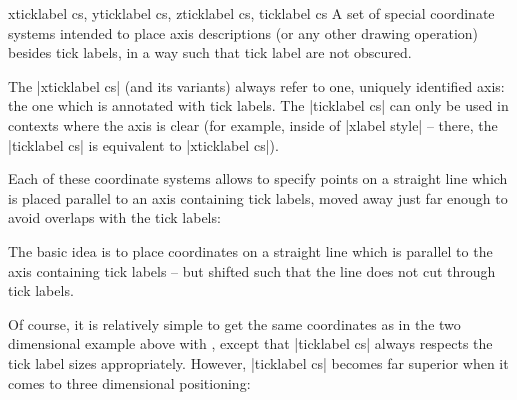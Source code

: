 \begin{coordinatesystemlist}{%
	xticklabel cs,%
	yticklabel cs,%
	zticklabel cs,
	ticklabel cs}
	A set of special coordinate systems intended to place axis descriptions (or any other drawing operation) besides tick labels, in a way such that tick label are not obscured.

	The |xticklabel cs| (and its variants) always refer to one, uniquely identified axis: the one which is annotated with tick labels. The |ticklabel cs| can only be used in contexts where the axis is clear (for example, inside of |xlabel style| -- there, the |ticklabel cs| is equivalent to |xticklabel cs|).

	Each of these coordinate systems allows to specify points on a straight line which is placed parallel to an axis containing tick labels, moved away just far enough to avoid overlaps with the tick labels:
\begin{codeexample}[width=4cm]
\end{codeexample}

The basic idea is to place coordinates on a straight line which is parallel to the axis containing tick labels -- but shifted such that the line does not cut through tick labels.

Of course, it is relatively simple to get the same coordinates as in the two dimensional example above with , except that |ticklabel cs| always respects the tick label sizes appropriately. However, |ticklabel cs| becomes far superior when it comes to three dimensional positioning:


\end{coordinatesystemlist}
